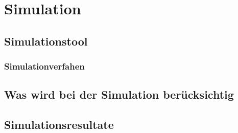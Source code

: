 \section{Simulation}
\subsection{Simulationstool}
\subsubsection{Simulationverfahen}
\subsection{Was wird bei der Simulation berücksichtig}
\subsection{Simulationsresultate}
